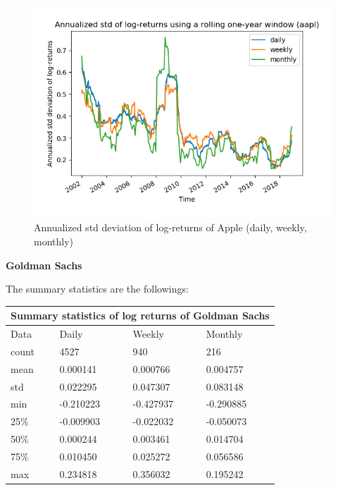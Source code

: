 \documentclass[10pt]{article}
\newenvironment{exercise}[2][Exercise]{\begin{trivlist}
  \item[\hskip \labelsep {\bfseries #1}\hskip \labelsep {\bfseries #2.}]}{\end{trivlist}}
\begin{document}
\begin{exercise}{4}
\begin{figure}[H]
		\centering
		\includegraphics[scale=0.5]{Figures/problem4d_std_aapl.png}	
		\caption{Annualized std deviation of log-returns of Apple (daily, weekly, monthly)}	
		\label{fig:problem3d_std_aapl}
	
	\end{figure}
		
	\bigbreak	
		
	\textbf{Goldman Sachs}
	
	\smallbreak
	
	The summary statistics are the followings:
	
	\bigbreak	
	
	\begin{tabular}{ |p{3cm}||p{3cm}|p{3cm}|p{3cm}|  }
 		\hline
		\multicolumn{4}{|c|}{Summary statistics of log returns of Goldman Sachs} \\
		\hline
		Data & Daily & Weekly & Monthly\\
 		\hline
 		count   &  4527 & 940 & 216\\
 		mean & 0.000141 & 0.000766 & 0.004757\\
 		std & 0.022295 & 0.047307 & 0.083148\\
 		min & -0.210223 & -0.427937 & -0.290885\\
 		25\% & -0.009903 & -0.022032 & -0.050073\\
 		50\% & 0.000244 & 0.003461 & 0.014704\\
 		75\% & 0.010450 & 0.025272 & 0.056586\\
 		max & 0.234818 & 0.356032 & 0.195242\\
 		\hline
	\end{tabular}
	

\end{exercise}
\end{document}
